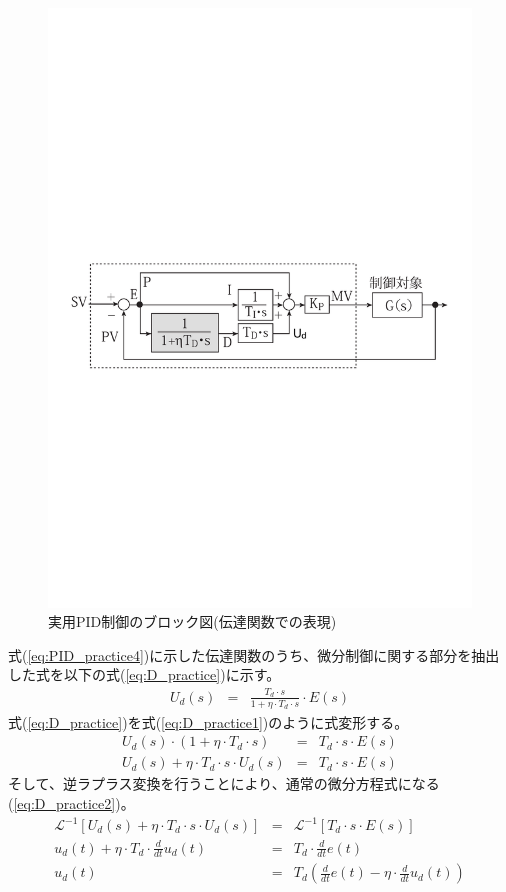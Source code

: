 \documentclass[a4j]{ujarticle}
\begin{document}
\begin{figure}[htbp]
  \centering
  \includegraphics[width=0.8\hsize]{pid_practice_block2.pdf}
  \caption{実用PID制御のブロック図(伝達関数での表現)}
  \label{pid_practice_block2}
\end{figure}


式(\ref{eq:PID_practice4})に示した伝達関数のうち、微分制御に関する部分を抽出した式を以下の式(\ref{eq:D_practice})に示す。
\begin{eqnarray}
  U_d(s) &=& \frac{T_d \cdot s}{1 + \eta \cdot T_d \cdot s} \cdot E(s)
  \label{eq:D_practice}
\end{eqnarray}
式(\ref{eq:D_practice})を式(\ref{eq:D_practice1})のように式変形する。
\begin{eqnarray}
  U_d(s) \cdot (1 + \eta \cdot T_d \cdot s) &=& T_d \cdot s \cdot E(s)\nonumber\\
  U_d(s) + \eta \cdot T_d \cdot s \cdot U_d(s) &=& T_d \cdot s \cdot E(s)
  \label{eq:D_practice1}
\end{eqnarray}
そして、逆ラプラス変換を行うことにより、通常の微分方程式になる(\ref{eq:D_practice2})。
\begin{eqnarray}
  \mathcal{L}^{-1}[U_d(s) + \eta \cdot T_d \cdot s \cdot U_d(s)] &=& \mathcal{L}^{-1}[T_d \cdot s \cdot E(s)]\nonumber\\
  u_d(t) + \eta \cdot T_d \cdot \frac{d}{dt}u_d(t) &=& T_d \cdot \frac{d}{dt}e(t)\nonumber\\
  u_d(t) &=& T_d (\frac{d}{dt}e(t) - \eta \cdot \frac{d}{dt}u_d(t))
  \label{eq:D_practice2}
\end{eqnarray}
\end{document}

